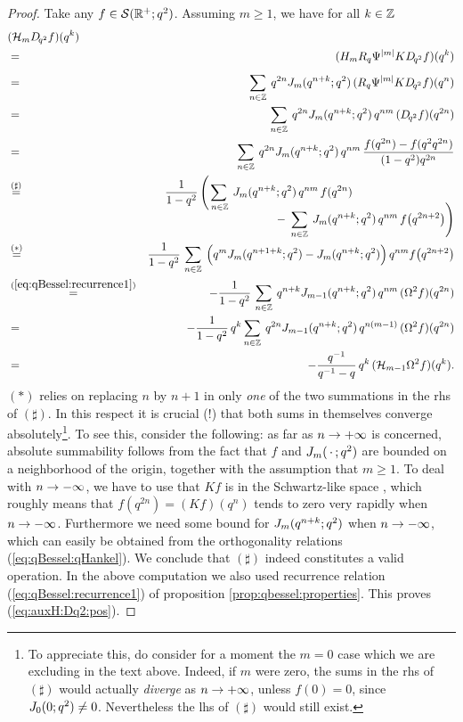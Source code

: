 \begin{proof}
Take any $f\in {\mathcal S}(\mathbb{R}^+;q^2)$. Assuming $m \geq 1$, we have for all $k\in \mathbb{Z}$
\begin{eqnarray*}
\lefteqn{(\auxH{m} \Dqsqr f)(q^k)}
\\&=&
  (H_m R_q \Psi^{|m|} K \Dqsqr f)(q^k)
\\&=\vertXL&
  \sum_{n\in \ZZ} \: q^{2n} \J{m}{q^{n+k}}\, (R_q \Psi^{|m|} K \Dqsqr f)(q^n)
\\&=&
  \sum_{n\in \ZZ} \: q^{2n} \J{m}{q^{n+k}}\, q^{nm}\,(\Dqsqr f)(q^{2n})
\\&=&
   \sum_{n\in \ZZ} \: q^{2n} \J{m}{q^{n+k}}\, q^{nm}\,
         \frac{f(q^{2n}) - f(q^2 q^{2n})}{(1-q^2) q^{2n}}
\\&\stackrel{(\sharp)}{=}&
  \frac{1}{1-q^2} \left( \sum_{\: n\in \ZZ} \: \J{m}{q^{n+k}}\, q^{nm} \, f(q^{2n})\right.
  \hspace{-7em}
  \raisebox{-5.5ex}{$ \displaystyle
  \left.  -\;\sum_{n\in \ZZ} \: \J{m}{q^{n+k}}\, q^{nm}\, f\!\left(q^{2n+2}\right) \right)
  $}
\\&\stackrel{(*)}{=}&
  \frac{1}{1-q^2}\, \sum_{n\in \ZZ} \:
        \left(q^m \J{m}{q^{n+1+k}} - \J{m}{q^{n+k}}\vertL\right)
        q^{nm} f\!\left(q^{2n+2}\right)
\\&\stackrel{(\ref{eq:qBessel:recurrence1})}{=}&
       -\frac{1}{1-q^2}\, \sum_{n\in \ZZ} \:
         q^{n+k} \J{m-1}{q^{n+k}}\, q^{nm} \, (\Omega^2 f)(q^{2n})
\\&=&
    -\frac{1}{1-q^2}\, q^k \sum_{n\in \ZZ} \:
         q^{2n} \J{m-1}{q^{n+k}} \, q^{n(m-1)}\, (\Omega^2 f)(q^{2n})
\\&=&
    -\frac{q^{-1}}{q^{-1}-q}\, q^k \, (\auxH{m-1} \Omega^2 f)(q^k).
\end{eqnarray*}
$(*)$ relies on replacing $n$ by $n+1$ in only {\em one\/} of the two summations
in the {\sc rhs} of $(\sharp)$. In this respect it is
crucial (!) that both sums in themselves converge
absolutely\footnote{To appreciate this, do consider for a moment the
$m=0$ case which we are excluding in the text above. Indeed, if $m$ were zero, the
sums in the {\sc rhs} of $(\sharp)$ would actually {\em diverge\/}
as $n \rightarrow +\infty$, unless $f(0)=0$, since $J_{0}(0; q^2)\neq 0$.
Nevertheless the {\sc lhs} of $(\sharp)$ would still exist.}. To see this,
consider the following: %
as far as $n \rightarrow +\infty$ is concerned,
absolute summability follows from the fact that $f$ and $J_{m}(\,\cdot\,; q^2)$
are bounded on a neighborhood of the origin, together with the
assumption that $m\geq 1$. To deal with $n \rightarrow -\infty$, we have to use
that $Kf$ is in the Schwartz-like space \Swq, which roughly means that
$f(q^{2n})= (Kf)(q^n)$ tends to zero very rapidly when $n \rightarrow -\infty$.
Furthermore we need some bound for $J_{m}(q^{n+k}; q^2)$ when $n \rightarrow -\infty$,
which can easily be obtained from the orthogonality relations
(\ref{eq:qBessel:qHankel}). We conclude that $(\sharp)$ indeed constitutes a
valid operation. In the above computation we also used recurrence relation
(\ref{eq:qBessel:recurrence1}) of proposition \ref{prop:qbessel:properties}\@.
This proves (\ref{eq:auxH:Dq2:pos}).




\end{proof}
